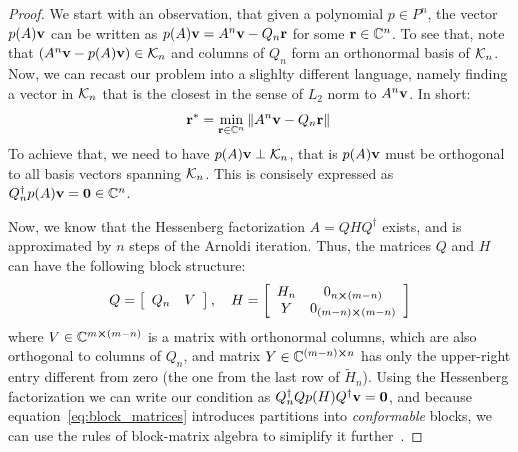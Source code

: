 \begin{proof}
	We start with an observation, that given a polynomial \(p\in P^n\), the vector \(p(A)\vectorbold{v}\)
	can be written as \(p(A)\vectorbold{v} = A^n \vectorbold{v} - Q_n \vectorbold{r}\) for some \(\vectorbold{r}\in \CC^n\).
	To see that, note that \(\left(A^n \vectorbold{v} - p(A)\vectorbold{v}\right) \in \K{n}\) and columns of \(Q_n\) form an
	orthonormal basis of \(\mathcal{K}_{n}\). Now, we can recast our problem into a slighlty different language, namely finding a vector
	in \(\mathcal{K}_{n}\) that is the closest in the sense of \(L_2\) norm to \(A^n \vectorbold{v}\). In short:
	\begin{equation*}
		\vectorbold{r}^{\ast} = \min_{\vectorbold{r}\in\CC^n}\norm*{A^n \vectorbold{v} - Q_n \vectorbold{r}}
	\end{equation*}
	To achieve that, we need to have \(p(A)\vectorbold{v}\perp \K{n}\), that is \(p(A)\vectorbold{v}\) must
	be orthogonal to all basis vectors spanning \(\mathcal{K}_{n}\). This is consisely expressed as 
	\(Q^{\dagger}_{n} p(A)\vectorbold{v} = \vectorbold{0}\in \CC^n\).

	Now, we know that the Hessenberg factorization \(A = QHQ^{\dagger}\) exists, and is approximated by \(n\) steps
	of the Arnoldi iteration. Thus, the matrices \(Q\) and \(H\) can have the following block structure:
	\begin{equation}
		Q=\left[\begin{array}{ll}
			Q_n & V
			\end{array}\right],
			\quad H=\left[\begin{array}{cc}
			H_n & 0_{n\cross(m-n)} \\
			Y & 0_{(m-n)\cross(m-n)}
			\end{array}\right]
			\label{eq:block_matrices}
	\end{equation}
	where \(V \in \mathbb{C}^{m\cross(m-n)}\) is a matrix with orthonormal columns, which are also orthogonal to columns of
	\(Q_n\), and matrix \(Y\in\mathbb{C}^{(m-n)\cross n}\) has only the upper-right entry different from zero
	(the one from the last row of \(\tilde{H}_n\)). Using the Hessenberg factorization we can write our condition
	as \(Q_n^{\dagger} Q p(H) Q^{\dagger}\vectorbold{v} = \vectorbold{0}\), and because equation~\eqref{eq:block_matrices}
	introduces partitions into \textit{conformable} blocks, we can use the rules of block-matrix algebra to simiplify
	it further~\autocite{Eves1980}.


\end{proof}
